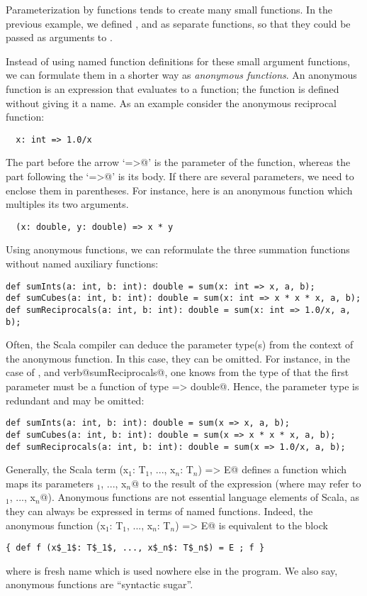 \documentclass[11pt]{book}
\begin{document}
Parameterization by functions tends to create many small functions. In
the previous example, we defined \verb@id@, \verb@cube@ and
\verb@reciprocal@ as separate functions, so that they could be 
passed as arguments to \verb@sum@.

Instead of using named function definitions for these small argument
functions, we can formulate them in a shorter way as {\em anonymous
functions}. An anonymous function is an expression that evaluates to a
function; the function is defined without giving it a name. As an
example consider the anonymous reciprocal function:
\begin{verbatim}
  x: int => 1.0/x
\end{verbatim}
The part before the arrow `\verb@=>@' is the parameter of the function,
whereas the part following the `\verb@=>@' is its body. If there are
several parameters, we need to enclose them in parentheses. For
instance, here is an anonymous function which multiples its two arguments.
\begin{verbatim}
  (x: double, y: double) => x * y
\end{verbatim}
Using anonymous functions, we can reformulate the three summation
functions without named auxiliary functions:
\begin{verbatim}
def sumInts(a: int, b: int): double = sum(x: int => x, a, b);
def sumCubes(a: int, b: int): double = sum(x: int => x * x * x, a, b);
def sumReciprocals(a: int, b: int): double = sum(x: int => 1.0/x, a, b);
\end{verbatim}
Often, the Scala compiler can deduce the parameter type(s) from the
context of the anonymous function. In this case, they can be omitted.
For instance, in the case of \verb@sumInts@, \verb@sumCubes@ and
verb@sumReciprocals@, one knows from the type of
\verb@sum@ that the first parameter must be a function of type
\verb@int => double@.  Hence, the parameter type \verb@int@ is
redundant and may be omitted:
\begin{verbatim}
def sumInts(a: int, b: int): double = sum(x => x, a, b);
def sumCubes(a: int, b: int): double = sum(x => x * x * x, a, b);
def sumReciprocals(a: int, b: int): double = sum(x => 1.0/x, a, b);
\end{verbatim}

Generally, the Scala term
\verb@(x$_1$: T$_1$, ..., x$_n$: T$_n$) => E@ 
defines a function which maps its parameters
\verb@x$_1$, ..., x$_n$@ to the result of the expression \verb@E@
(where \verb@E@ may refer to \verb@x$_1$, ..., x$_n$@).  Anonymous
functions are not essential language elements of Scala, as they can
always be expressed in terms of named functions. Indeed, the 
anonymous function
\verb@(x$_1$: T$_1$, ..., x$_n$: T$_n$) => E@ 
is equivalent to the block
\begin{verbatim}
{ def f (x$_1$: T$_1$, ..., x$_n$: T$_n$) = E ; f }
\end{verbatim}
where \verb@f@ is fresh name which is used nowhere else in the program.
We also say, anonymous functions are ``syntactic sugar''.
\end{document}
